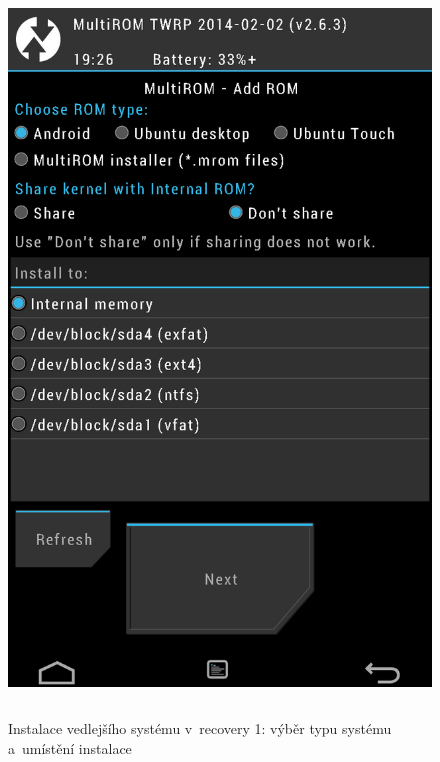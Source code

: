 \documentclass[12pt, a4paper, oneside]{article}
\begin{document}
\begin{figure}[H]
\begin{center}
 \includegraphics[height=550pt]{img/recovery_install1.png}
\caption{Instalace vedlejšího systému v~recovery 1: výběr typu systému a~umístění instalace}
\end{center}
\end{figure}
\end{document}

